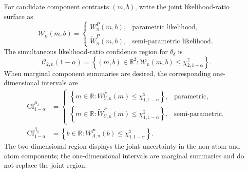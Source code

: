 \documentclass[11pt]{article}
\begin{document}
For candidate component contrasts $(m,b)$, write the joint likelihood-ratio surface as
\begin{equation}
  \mathcal{W}_n(m,b)
  =
  \begin{cases}
    W_n^P(m,b), & \text{parametric likelihood},\\[0.4em]
    \widetilde{W}_n^P(m,b), & \text{semi-parametric likelihood}.
  \end{cases}
  \label{eq:generic-lr-surface}
\end{equation}
The simultaneous likelihood-ratio confidence region for $\theta_\delta$ is
\begin{equation}
  \mathcal{C}_{2,n}(1-\alpha)
  =
  \left\{
    (m,b)\in\mathbb{R}^2:
    \mathcal{W}_n(m,b)\leq\chi^2_{2,1-\alpha}
  \right\}.
  \label{eq:component-simultaneous-region}
\end{equation}
When marginal component summaries are desired, the corresponding one-dimensional intervals are
\begin{align*}
  \mathrm{CI}^{\mu_\delta}_{1-\alpha}
  &=
  \begin{cases}
    \left\{m\in\mathbb{R}:W_{Y,n}^P(m)\leq\chi^2_{1,1-\alpha}\right\},
      & \text{parametric},\\[0.4em]
    \left\{m\in\mathbb{R}:\widetilde{W}_{Y,n}^P(m)\leq\chi^2_{1,1-\alpha}\right\},
      & \text{semi-parametric},
  \end{cases}\\
  \mathrm{CI}^{\beta_\delta}_{1-\alpha}
  &=
  \left\{b\in\mathbb{R}:W_{A,n}^P(b)\leq\chi^2_{1,1-\alpha}\right\}.
\end{align*}
The two-dimensional region displays the joint uncertainty in the non-atom and atom components; the one-dimensional intervals are marginal summaries and do not replace the joint region.
\end{document}
